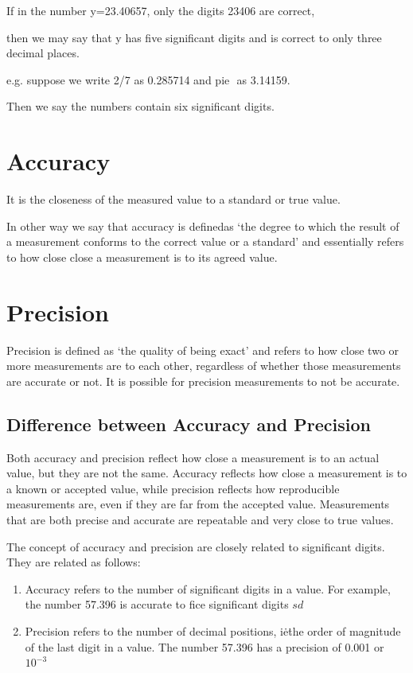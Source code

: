 \documentclass[11pt, a4paper, oneside]{book}
\begin{document}
          If in the number y=23.40657, only the digits 23406 are correct,

          \noindent then we may say that y has five significant digits and is correct to only three decimal
          places.

          e.g. suppose we write 2/7 as 0.285714 and pie \( \) as 3.14159.

          \noindent Then we say the numbers contain six significant digits.


        \section{Accuracy}
          It is the closeness of the measured value to a standard or true value.

          In other way we say that accuracy is definedas `the degree to which the result of a measurement conforms
          to the correct value or a standard' and essentially refers to how close close a measurement is to its
          agreed value.

        \section{Precision}
          Precision is defined as ‘the quality of being exact’ and refers to how close two or more measurements
          are to each other, regardless of whether those measurements are accurate or not. It is possible for
          precision measurements to not be accurate.

        \subsection{Difference between Accuracy and Precision}
          Both accuracy and precision reflect how close a measurement is to an actual value, but they are not the
          same. Accuracy reflects how close a measurement is to a known or accepted value, while precision reflects
          how reproducible measurements are, even if they are far from the accepted value. Measurements that are
          both precise and accurate are repeatable and very close to true values.

          The concept of accuracy and precision are closely related to significant digits. They are related as follows:

          \begin{enumerate}
          \item Accuracy refers to the number of significant digits in a value. For example, the number 57.396 is
            accurate to fice significant digits \(sd\)

          \item Precision refers to the number of decimal positions, i\.e\. the order of magnitude of the
            last digit in a value. The number 57.396 has a precision of 0.001 or $10^{-3}$
          \end{enumerate}
\end{document}
